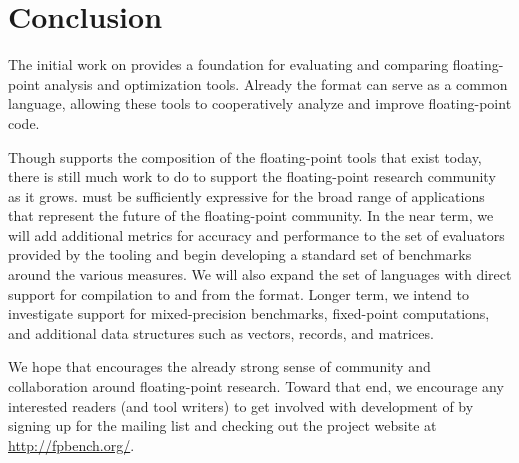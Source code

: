 \documentclass[main.tex]{subfiles}
\begin{document}
\section{Conclusion}
\label{sec:conclusion}

The initial work on \name provides a
foundation for evaluating and comparing floating-point analysis and
optimization tools.  Already the \name format can serve as a
common language, allowing these tools to
cooperatively analyze and improve floating-point code.

Though \name supports the composition
  of the floating-point tools that exist today,
  there is still much work to do to support
  the floating-point research community as it grows.
\name must be sufficiently expressive for the broad range of applications
  that represent the future of the floating-point community.
In the near term, we will add additional
metrics for accuracy and performance to the set of evaluators provided by
the \name tooling and begin developing a standard set of benchmarks
around the various measures. We will also expand the set of languages with
direct support for compilation to and from the \name format. Longer
term, we intend to investigate support for mixed-precision benchmarks,
fixed-point computations, and additional data structures such as
vectors, records, and matrices.

We hope that \name encourages the already strong sense of community
and collaboration around floating-point research.  Toward that end, we
encourage any interested readers (and tool writers)
to get involved with development of \name
by signing up for the mailing list and checking out the project
website at \url{http://fpbench.org/}.
\end{document}
